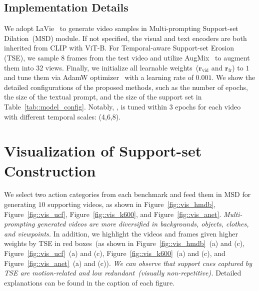 \subsection{Implementation Details}
{
    We adopt LaVie~\cite{wang2023laviehighqualityvideogeneration} to generate video samples in Multi-prompting Support-set Dilation~(MSD) module. If not specified, the visual and text encoders are both inherited from CLIP with ViT-B. 
    For Temporal-aware Support-set Erosion (TSE), we sample $8$ frames from the test video and utilize AugMix~\cite{hendrycks2020augmix} to augment them into $32$ views. 
    Finally, we initialize all learnable weights~($\bm{r}_\mathrm{vid}$ and $\bm{r}_\mathrm{fr}$) to $1$ and tune them via AdamW optimizer~\cite{loshchilov2019decoupledweightdecayregularization} with a learning rate of $0.001$. We show the detailed configurations of the proposed methods, such as the number of epochs, the size of the textual prompt, and the size of the support set in Table~\ref{tab::model_config}. Notably, \testv, is tuned within $3$ epochs for each video with different temporal scales: (4,6,8).

}


\section{Visualization of Support-set Construction}
{
We select two action categories from each benchmark and feed them in MSD for generating $10$ supporting videos, as shown in Figure~\ref{fig::vis_hmdb}, Figure~\ref{fig::vis_ucf}, Figure~\ref{fig::vis_k600}, and Figure~\ref{fig::vis_anet}. \textit{Multi-prompting generated videos are more diversified in backgrounds, objects, clothes, and viewpoints.} In addition, we highlight the videos and frames given higher weights by TSE in red boxes~(as shown in Figure~\ref{fig::vis_hmdb}~(a) and (c), Figure~\ref{fig::vis_ucf}~(a) and (c), Figure~\ref{fig::vis_k600}~(a) and (c), and Figure~\ref{fig::vis_anet}~(a) and (c)). \textit{We can observe that support cues captured by TSE are motion-related and low redundant~(visually non-repetitive).} Detailed explanations can be found in the caption of each figure.






}

